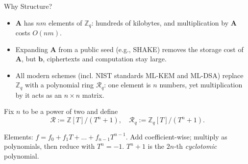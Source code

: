 \documentclass{zkdl-presentation-template}
\begin{document}
    \begin{frame}{Why Structure?}
        \begin{itemize}
            \item $\mathbf{A}$ has $nm$ elements of $\mathbb{Z}_q$: hundreds of kilobytes, and multiplication by $\mathbf{A}$ costs $O(nm)$.\pause
            \item Expanding $\mathbf{A}$ from a public seed (e.g., SHAKE) removes the storage cost of $\mathbf{A}$, but $\mathbf{b}$, ciphertexts and computation stay large.\pause
            \item All modern schemes (incl. NIST standards ML-KEM and ML-DSA) replace $\mathbb{Z}_q$ with a polynomial ring $\mathcal{R}_q$: one element is $n$ numbers, yet multiplication by it acts as an $n \times n$ matrix.
        \end{itemize}
        \pause

        \begin{definition}
            Fix $n$ to be a power of two and define
            \begin{equation*}
                \mathcal{R} := \mathbb{Z}[T]/(T^n+1), \quad \mathcal{R}_q := \mathbb{Z}_q[T]/(T^n+1).
            \end{equation*}
        \end{definition}
        Elements: $f = f_0 + f_1T + \dots + f_{n-1}T^{n-1}$. Add coefficient-wise; multiply as polynomials, then reduce with $T^n = -1$. $T^n+1$ is the $2n$-th \emph{cyclotomic} polynomial.
    \end{frame}
\end{document}
